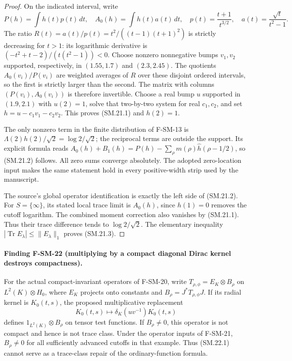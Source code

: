 \documentclass[11pt,a4paper]{article}
\theoremstyle{definition}\newtheorem{definition}[theorem]{Definition}
\theoremstyle{remark}\newtheorem{remark}[theorem]{Remark}
\begin{document}
\begin{proof}
On the indicated interval, write
\[
 P(h)=\int h(t)p(t)\,dt,\quad
 A_0(h)=\int h(t)a(t)\,dt,\quad
 p(t)=\frac{t+1}{t^{3/2}},\quad
 a(t)=\frac{\sqrt t}{t^2-1}.
\]
The ratio
$R(t)=a(t)/p(t)=t^2/((t-1)(t+1)^2)$ is strictly decreasing for
$t>1$: its logarithmic derivative is
$(-t^2+t-2)/(t(t^2-1))<0$.
Choose nonzero nonnegative bumps $v_1,v_2$ supported,
respectively, in $(1.55,1.7)$ and $(2.3,2.45)$.
The quotients $A_0(v_i)/P(v_i)$ are weighted averages of
$R$ over these disjoint ordered intervals, so the first
is strictly larger than the second.  The matrix with
columns $(P(v_i),A_0(v_i))$ is therefore invertible.
Choose a real bump $u$ supported in $(1.9,2.1)$ with
$u(2)=1$, solve that two-by-two system for real $c_1,c_2$,
and set $h=u-c_1v_1-c_2v_2$.  This proves (SM.21.1) and
$h(2)=1$.

The only nonzero term in the finite distribution of F-SM-13 is
$\Lambda(2)h(2)/\sqrt2=\log2/\sqrt2$; the reciprocal terms
are outside the support.  Its explicit formula reads
$A_0(h)+B_1(h)=P(h)-\sum_\rho m(\rho)\widehat h(\rho-1/2)$,
so (SM.21.2) follows.  All zero sums converge absolutely.
The adopted zero-location input makes the same statement
hold in every positive-width strip used by the manuscript.

The source's global operator identification is exactly the
left side of (SM.21.2).  For $S=\{\infty\}$, its stated
local trace limit is $A_0(h)$, since $h(1)=0$ removes the
cutoff logarithm.  The combined moment correction also
vanishes by (SM.21.1).  Thus their trace difference tends
to $\log2/\sqrt2$.  The elementary inequality
$|\operatorname{Tr}E_\lambda|\leq\|E_\lambda\|_1$
proves (SM.21.3).
\end{proof}

\paragraph{Finding F-SM-22 (multiplying by a compact diagonal Dirac kernel destroys compactness).}
For the actual compact-invariant operators of F-SM-20, write
$T_{\rho,\phi}=E_K\otimes B_\rho$ on
$L^2(K)\otimes H_0$, where $E_K$ projects onto constants
and $B_\rho=J^*T_{\rho,\phi}J$.
If its radial kernel is $K_0(t,s)$, the proposed
multiplicative replacement
\[
 K_0(t,s)\longmapsto \delta_K(uv^{-1})K_0(t,s)
 \tag{SM.22.1}
\]
defines $1_{L^2(K)}\otimes B_\rho$ on tensor test functions.
If $B_\rho\ne0$, this operator is not compact and hence
is not trace class.  Under the operator inputs of F-SM-21,
$B_\rho\ne0$ for all sufficiently advanced cutoffs in that
example.  Thus (SM.22.1) cannot serve as a trace-class repair
of the ordinary-function formula.
\end{document}
